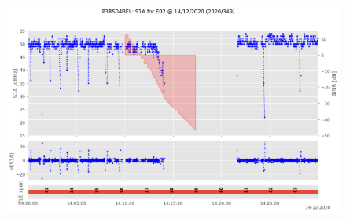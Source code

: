 \begin{enumerate}
\begin{figure}[H]%
\centering%
\includegraphics[width=0.95\linewidth]{png/P3RS04BEL_R_20203490000_01D_00U_MO_E-S1A-E02.png}%
\end{figure}


\end{enumerate}
